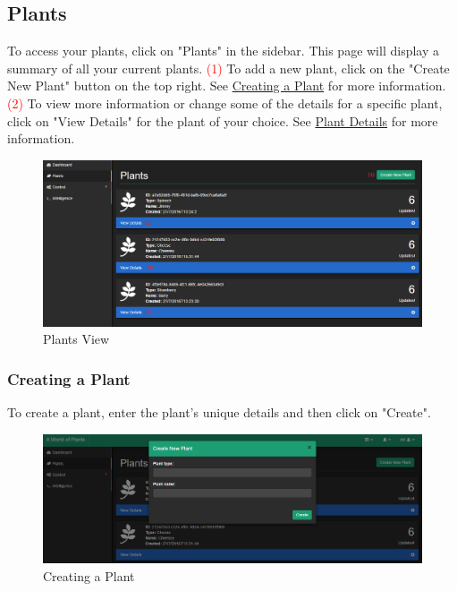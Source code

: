 \documentclass{article}
\begin{document}
	\subsection{Plants}
	To access your plants, click on "Plants" in the sidebar. This page will display a summary of all your current plants.
	\newline
	\textcolor{red}{(1)} To add a new plant, click on the "Create New Plant" button on the top right. See \hyperref[sec:creating-a-plant]{Creating a Plant} for more information.
	\newline
	\textcolor{red}{(2)} To view more information or change some of the details for a specific plant, click on "View Details" for the plant of your choice. See \hyperref[sec:plant-details]{Plant Details} for more information.
	\begin{figure}[H]
		\includegraphics[width=\textwidth]{../images/UserManual/plants.PNG}
		\caption{Plants View}
	\end{figure}
		
		\subsubsection{Creating a Plant}
		\label{sec:creating-a-plant}
		To create a plant, enter the plant's unique details and then click on "Create".
		\begin{figure}[H]
			\includegraphics[width=\textwidth]{../images/UserManual/create-plant.PNG}
			\caption{Creating a Plant}
		\end{figure}
		
\end{document}
